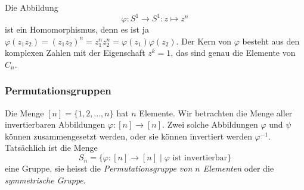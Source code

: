 Die Abbildung
\[
\varphi
\colon
S^1\to S^1
:
z\mapsto z^n
\]
ist ein Homomorphismus, denn es ist ja $\varphi(z_1z_2)=(z_1z_2)^n
= z_1^nz_2^n=\varphi(z_1)\varphi(z_2)$.
Der Kern von $\varphi$ besteht aus den komplexen Zahlen mit der 
Eigenschaft $z^k=1$, das sind genau die Elemente von $C_n$.

%
%
\subsubsection{Permutationsgruppen}
Die Menge $[n]=\{1,2,\dots,n\}$ hat $n$ Elemente.
Wir betrachten die Menge aller invertierbaren Abbildungen
$\varphi\colon [n] \to [n]$.
Zwei solche Abbildungen $\varphi$ und $\psi$ können zusammengesetzt
werden, oder sie können invertiert werden $\varphi^{-1}$.
Tatsächlich ist die Menge 
\[
S_n = \{\varphi\colon [n] \to [n]\mid \text{$\varphi$ ist invertierbar} \}
\]
eine Gruppe, sie heisst die {\em Permutationsgruppe von $n$ Elementen}
oder die {\em symmetrische Gruppe}.

